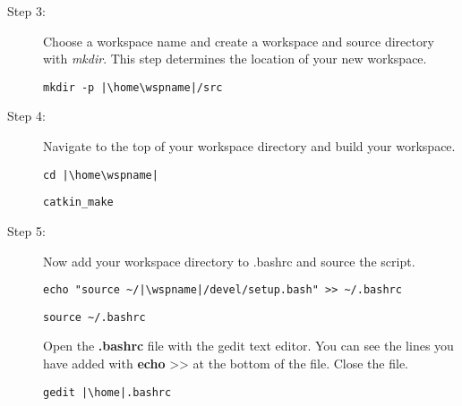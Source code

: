 \documentclass[12pt]{article}
\newcommand{\R}{\color{red}}
\newcommand{\K}{\color{black}}
\newcommand{\wspname}{\R<workspace\_name>\K}
\newcommand{\home}{\textasciitilde/}
\newcommand{\rosdistro}{melodic}
\begin{document}
\begin{description}[labelindent=1cm]
\begin{description}
		\item[Step 3:] Choose a workspace name and create a workspace and source directory with {\it mkdir}. This step determines the location of your new workspace.
		\begin{verbatim}
mkdir -p |\home\wspname|/src
		\end{verbatim}
		
		
		\item[Step 4:] Navigate to the top of your workspace directory and build your workspace.
		\begin{verbatim}
cd |\home\wspname|
		\end{verbatim}
		
		\begin{verbatim}
catkin_make
		\end{verbatim}
		
		
		\item [Step 5:]  Now add your workspace directory to .bashrc and source the script.
		\begin{verbatim} 
echo "source ~/|\wspname|/devel/setup.bash" >> ~/.bashrc
		\end{verbatim}
		
		\begin{verbatim} 
source ~/.bashrc 
		\end{verbatim}
		
		\begin{multicols}{2}
		Open the {\bf .bashrc} file with the gedit text editor. You can see the lines you have added with {\bf echo} >> at the bottom of the file. Close the file.  
		\begin{verbatim}  
gedit |\home|.bashrc
		\end{verbatim}
		\end{multicols}
		
		
	\end{description}
	

\end{description}
\end{document}
